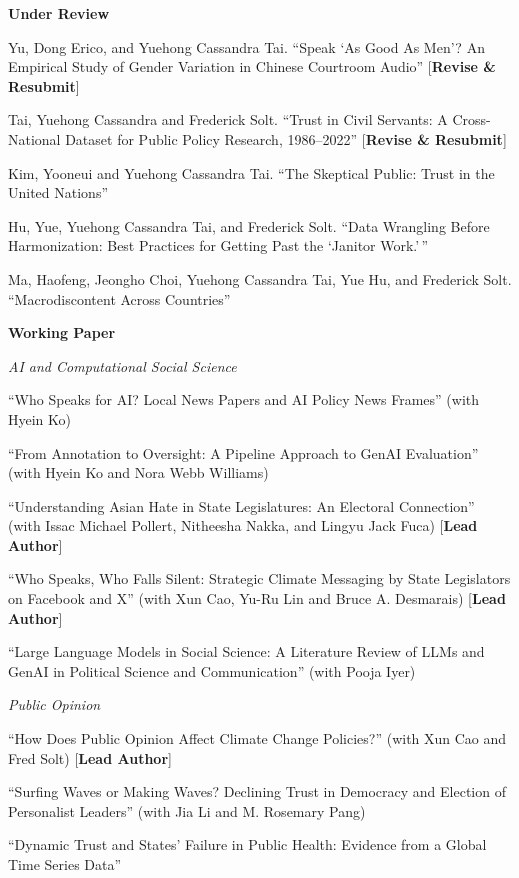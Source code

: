 \documentclass[10.5pt,]{article}
\providecommand{\tightlist}{%
	\setlength{\itemsep}{0pt}\setlength{\parskip}{0pt}}
\renewenvironment{itemize}{
	\begin{list}{}{
			\setlength{\leftmargin}{1.5em}
		}
	}{
	\end{list}
}
\begin{document}
\begin{itemize}
\tightlist
\item
  \textbf{Under Review}

  \begin{itemize}
  \tightlist
  \item
    Yu, Dong Erico, and Yuehong Cassandra Tai. ``Speak `As Good As Men'?
    An Empirical Study of Gender Variation in Chinese Courtroom Audio''
    {[}\textbf{Revise \& Resubmit}{]}
  \item
    Tai, Yuehong Cassandra and Frederick Solt. ``Trust in Civil
    Servants: A Cross-National Dataset for Public Policy Research,
    1986--2022'' {[}\textbf{Revise \& Resubmit}{]}
  \item
    Kim, Yooneui and Yuehong Cassandra Tai. ``The Skeptical Public:
    Trust in the United Nations''
  \item
    Hu, Yue, Yuehong Cassandra Tai, and Frederick Solt. ``Data Wrangling
    Before Harmonization: Best Practices for Getting Past the `Janitor
    Work.'\,''
  \item
    Ma, Haofeng, Jeongho Choi, Yuehong Cassandra Tai, Yue Hu, and
    Frederick Solt. ``Macrodiscontent Across Countries''
  \end{itemize}
\item
  \textbf{Working Paper}

  \begin{itemize}
  \tightlist
  \item
    \emph{AI and Computational Social Science}
  \item
    ``Who Speaks for AI? Local News Papers and AI Policy News Frames''
    (with Hyein Ko)
  \item
    ``From Annotation to Oversight: A Pipeline Approach to GenAI
    Evaluation'' (with Hyein Ko and Nora Webb Williams)
  \item
    ``Understanding Asian Hate in State Legislatures: An Electoral
    Connection'' (with Issac Michael Pollert, Nitheesha Nakka, and
    Lingyu Jack Fuca) {[}\textbf{Lead Author}{]}
  \item
    ``Who Speaks, Who Falls Silent: Strategic Climate Messaging by State
    Legislators on Facebook and X'' (with Xun Cao, Yu-Ru Lin and Bruce
    A. Desmarais) {[}\textbf{Lead Author}{]}
  \item
    ``Large Language Models in Social Science: A Literature Review of
    LLMs and GenAI in Political Science and Communication'' (with Pooja
    Iyer)
  \item
    \emph{Public Opinion}
  \item
    ``How Does Public Opinion Affect Climate Change Policies?'' (with
    Xun Cao and Fred Solt) {[}\textbf{Lead Author}{]}
  \item
    ``Surfing Waves or Making Waves? Declining Trust in Democracy and
    Election of Personalist Leaders'' (with Jia Li and M. Rosemary Pang)
  \item
    ``Dynamic Trust and States' Failure in Public Health: Evidence from
    a Global Time Series Data''
  \end{itemize}
\end{itemize}
\end{document}
